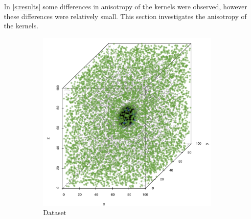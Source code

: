 
In \cref{s:results} some differences in anisotropy of the kernels were observed, however these differences were relatively small. This section investigates the anisotropy of the kernels. 
	
		\begin{figure}
			\centering
			\begin{subfigure}{0.23\textwidth}
				\centering
				\includegraphics[keepaspectratio=true, width=\textwidth, height=0.23\textheight]{discussion/img/ferdosi_1_60000_anisotropy.png}
				\caption{Dataset \ferdosiOne}
				\label{fig:discussion:anisotropy:ferdosi1}
			\end{subfigure}
			\begin{subfigure}{0.23\textwidth}
				\centering

\end{subfigure}
\end{figure}
